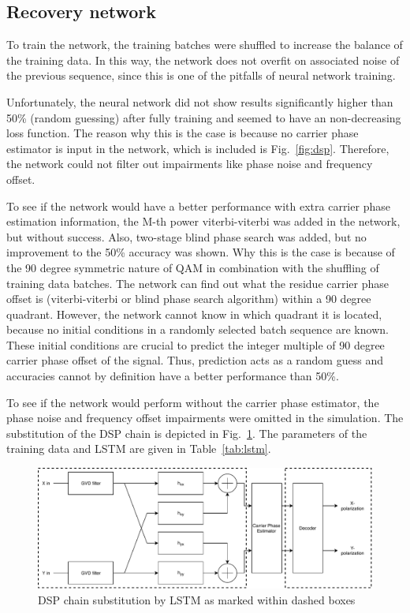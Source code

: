 \documentclass[journal,10pt,twoside, a4paper]{IEEEtran}
\begin{document}
\subsection{Recovery network}
To train the network, the training batches were shuffled to increase the balance of the training data. In this way, the network does not overfit on associated noise of the previous sequence, since this is one of the pitfalls of neural network training.

Unfortunately, the neural network did not show results significantly higher than 50\% (random guessing) after fully training and seemed to have an non-decreasing loss function. The reason why this is the case is because no carrier phase estimator is input in the network, which is included is Fig.~\ref{fig:dsp}. Therefore, the network could not filter out impairments like phase noise and frequency offset.

To see if the network would have a better performance with extra carrier phase estimation information, the M-th power viterbi-viterbi was added in the network, but without success. Also, two-stage blind phase search was added, but no improvement to the 50\% accuracy was shown. Why this is the case is because of the 90 degree symmetric nature of QAM in combination with the shuffling of training data batches. The network can find out what the residue carrier phase offset is (viterbi-viterbi or blind phase search algorithm) within a 90 degree quadrant. However, the network cannot know in which quadrant it is located, because no initial conditions in a randomly selected batch sequence are known. These initial conditions are crucial to predict the integer multiple of 90 degree carrier phase offset of the signal. Thus, prediction acts as a random guess and accuracies cannot by definition have a better performance than 50\%. 

To see if the network would perform without the carrier phase estimator, the phase noise and frequency offset impairments were omitted in the simulation. The substitution of the DSP chain is depicted in Fig.~\ref{fig:dsp_sub}. The parameters of the training data and LSTM are given in Table~\ref{tab:lstm}. 

\begin{figure}
    \centering
    \includegraphics[width=\linewidth]{Thesis/images/DSP_LSTM.pdf}
    \caption{DSP chain substitution by LSTM as marked within dashed boxes}
    \label{fig:dsp_sub}
\end{figure}
\end{document}
